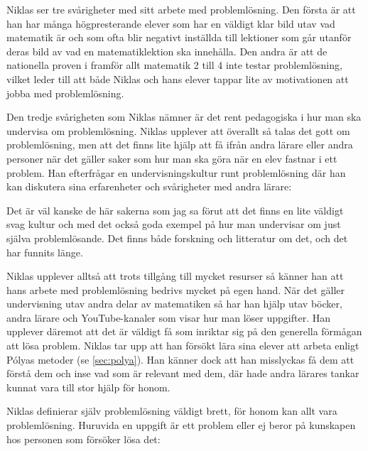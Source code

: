 \textcolor{turkos}{
Niklas ser tre svårigheter med sitt arbete med problemlösning. Den första är att han har många högpresterande elever som har en väldigt klar bild utav vad matematik är och som ofta blir negativt inställda till lektioner som går utanför deras bild av vad en matematiklektion ska innehålla. Den andra är att de nationella proven i framför allt matematik 2 till 4 inte testar problemlösning, vilket leder till att både Niklas och hans elever tappar lite av motivationen att jobba med problemlösning.}

\textcolor{turkos}{Den tredje svårigheten som Niklas nämner är det rent pedagogiska i hur man ska undervisa om problemlösning. Niklas upplever att överallt så talas det gott om problemlösning, men att det finns lite hjälp att få ifrån andra lärare eller andra personer när det gäller saker som hur man ska göra när en elev fastnar i ett problem. Han efterfrågar en undervisningskultur runt problemlösning där han kan diskutera sina erfarenheter och svårigheter med andra lärare: 
}

\begin{displayquote}
\textcolor{turkos}{Det är väl kanske de här sakerna som jag sa förut att det finns en lite väldigt svag kultur och med det också goda exempel på hur man undervisar om just själva problemlösande. Det finns både forskning och litteratur om det, och det har funnits länge.}
\end{displayquote}

\noindent\textcolor{turkos}{
Niklas upplever alltså att trots tillgång till mycket resurser så känner han att hans arbete med problemlösning bedrivs mycket på egen hand. När det gäller undervisning utav andra delar av matematiken så har han hjälp utav böcker, andra lärare och YouTube-kanaler som visar hur man löser uppgifter. Han upplever däremot att det är väldigt få som inriktar sig på den generella förmågan att lösa problem. Niklas tar upp att han försökt lära sina elever att arbeta enligt Pólyas metoder (se \ref{sec:polya}). Han känner dock att han misslyckas få dem att förstå dem och inse vad som är relevant med dem, där hade andra lärares tankar kunnat vara till stor hjälp för honom.
}

\textcolor{turkos}{
Niklas definierar själv problemlösning väldigt brett, för honom kan allt vara problemlösning. Huruvida en uppgift är ett problem eller ej beror på kunskapen hos personen som försöker lösa det:
}

